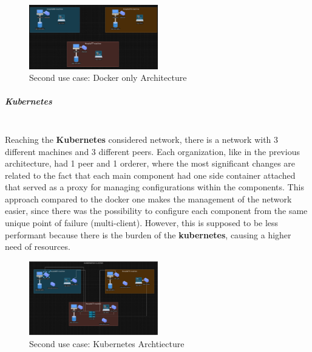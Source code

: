 \begin{figure}[H]
	\centering
	\includegraphics[width=0.5\textwidth]{assets/use-case-2/docker.png} %
	\caption{Second use case: Docker only Architecture}
	\label{fig:sample-image} 
\end{figure}

\subparagraph{Kubernetes} \mbox{}\\
Reaching the \textbf{Kubernetes} considered network, there is a network with 3 different machines and 3 different peers. Each organization, like in the previous architecture, had 1 peer and 1 orderer, where the most significant changes are related to the fact that each main component had one side container attached that served as a proxy for managing configurations within the components. This approach compared to the docker one makes the management of the network easier, since there was the possibility to configure each component from the same unique point of failure (multi-client). However, this is supposed to be less performant because there is the burden of the \textbf{kubernetes}, causing a higher need of resources.

\begin{figure}[H]
	\centering
	\includegraphics[width=0.5\textwidth]{assets/use-case-2/k8.png} %
	\caption{Second use case: Kubernetes Archtiecture}
	\label{fig:sample-image} 
\end{figure}


